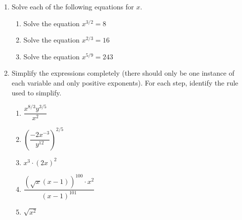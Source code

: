 \begin{enumerate}
%
%
%
%




\end{enumerate}



\begin{enumerate}
\item Solve each of the following equations for $x$.
  \begin{enumerate}
  \item Solve the equation $x^{3/2}=8$
  \item Solve the equation $x^{2/3}=16$
  \item Solve the equation $x^{5/9}=243$
  \end{enumerate}
\item Simplify the expressions completely (there should only be one
  instance of each variable and only positive exponents). For each
  step, identify the rule used to simplify.
  \begin{enumerate}
  \item $\dfrac{x^{8/3}y^{3/5}}{x^2}$
  \item $\left( \dfrac{-2x^{-3}}{y^{12} }  \right)^{2/5}$
  \item $x^3 \cdot (2x)^2$
  \item $\dfrac{(\sqrt{x}(x-1))^{100} \cdot x^2}{(x-1)^{101}}$ 
  \item $\sqrt{x^2}$
  \end{enumerate}
\end{enumerate}
